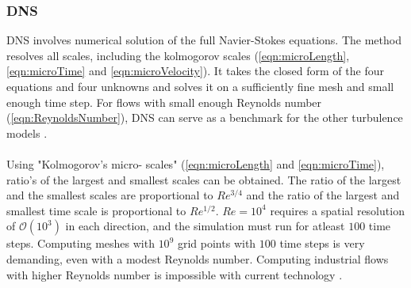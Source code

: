 \documentclass[a4paper, 12pt]{report}
\begin{document}
\subsubsection{DNS}
DNS involves numerical solution of the full Navier-Stokes equations. The method resolves all scales, including the kolmogorov scales (\ref{eqn:microLength}, \ref{eqn:microTime} and \ref{eqn:microVelocity}). It takes the closed form of the four equations and four unknowns and solves it on a sufficiently fine mesh and small enough time step. For flows with small enough Reynolds number (\ref{eqn:ReynoldsNumber}), DNS can serve as a benchmark for the other turbulence models \citep{AppliedMathematicalModelling}.\\
\\
Using "Kolmogorov's micro- scales" (\ref{eqn:microLength} and \ref{eqn:microTime}), ratio's of the largest and smallest scales can be obtained. The ratio of the largest and the smallest scales are proportional to  $Re^{3/4}$ and the ratio of the largest and smallest time scale is proportional to $Re^{1/2}$. $Re = 10^4$ requires a spatial resolution of $\mathcal{O}(10^3)$ in each direction, and the simulation must run for atleast $100$ time steps. Computing meshes with $10^9$ grid points with $100$ time steps is very demanding, even with a modest Reynolds number. Computing industrial flows with higher Reynolds number is impossible with current technology \cite{CFD, AppliedMathematicalModelling}.
\end{document}
